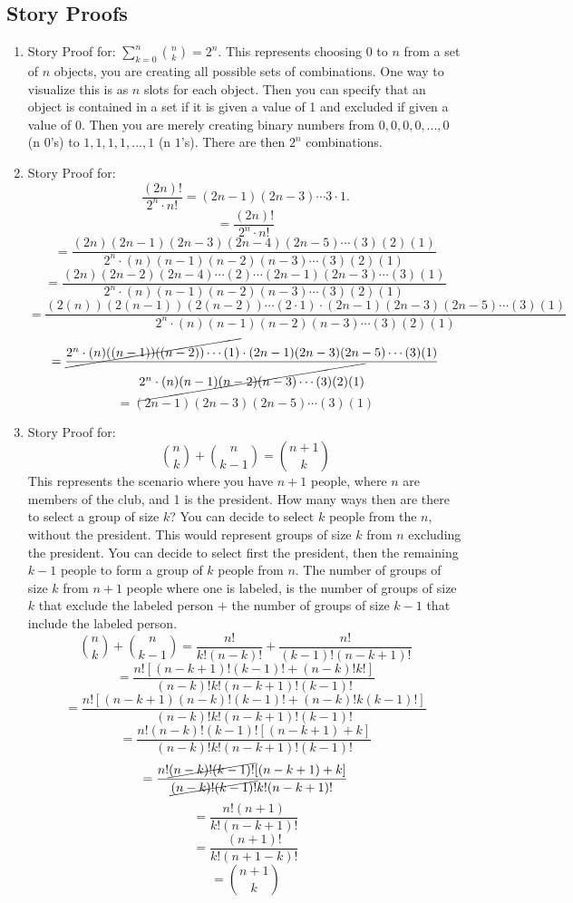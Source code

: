 \documentclass[11pt, oneside]{article}   	%
\begin{document}
\subsection{Story Proofs}
	\begin{enumerate}
		\item Story Proof for: $\sum_{k=0}^{n} \binom{n}{k} = 2^{n}$. This represents choosing 0 to $n$ from a set of $n$ objects, you are creating all possible sets of combinations. One way to visualize this is as $n$ slots for each object. Then you can specify that an object is contained in a set if it is given a value of 1 and excluded if given a value of 0. Then you are merely creating binary numbers from $0,0,0,0,...,0$ (n $0$'s) to $1,1,1,1,...,1$ (n $1$'s). There are then $2^{n}$ combinations.
		\item Story Proof for:
			\[
				\frac{(2n)!}{2^{n} \cdot n!} = (2n - 1)(2n - 3) \cdots 3 \cdot 1.
			\]
			\[
				= \frac{(2n)!}{2^{n} \cdot n!}
			\]
			\[
				= \frac{(2n)(2n-1)(2n-3)(2n-4)(2n-5) \cdots (3)(2)(1)}{2^{n} \cdot (n)(n-1)(n-2)(n-3) \cdots (3)(2)(1)}
			\]
			\[
				= \frac{(2n)(2n-2)(2n-4)  \cdots (2) \cdots (2n-1)(2n-3) \cdots (3)(1)}{2^{n} \cdot (n)(n-1)(n-2)(n-3) \cdots (3)(2)(1)}
			\]
			\[
				= \frac{(2(n))(2(n-1))(2(n-2)) \cdots (2 \cdot 1) \cdot (2n-1)(2n-3)(2n-5) \cdots (3)(1)}{2^{n} \cdot (n)(n-1)(n-2)(n-3) \cdots (3)(2)(1)}
			\]
			\vspace{4mm}
			\[
				= \frac{ \cancel{2^{n} \cdot (n)((n-1))((n-2)) \cdots (1)} \cdot (2n-1)(2n-3)(2n-5) \cdots (3)(1)}{\cancel{2^{n} \cdot (n)(n-1)(n-2)(n-3) \cdots (3)(2)(1)}}
			\]
			\vspace{4mm}
			\[
				= (2n-1)(2n-3)(2n-5) \cdots (3)(1)
			\]
		\item Story Proof for:
			\[
				\binom{n}{k} + \binom{n}{k-1} = \binom{n + 1}{k}
			\]
			This represents the scenario where you have $n + 1$ people, where $n$ are members of the club, and 1 is the president. How many ways then are there to select a group of size $k$? You can decide to select $k$ people from the $n$, without the president. This would represent groups of size $k$ from $n$ excluding the president. You can decide to select first the president, then the remaining $k-1$ people to form a group of $k$ people from $n$. The number of groups of size $k$ from $n+1$ people where one is labeled, is the number of groups of size $k$ that exclude the labeled person $+$ the number of groups of size $k-1$ that include the labeled person.
			\[
				\binom{n}{k} + \binom{n}{k-1} = \frac{n!}{k!(n-k)!} + \frac{n!}{(k-1)!(n-k+1)!}
			\]
			\[
				= \frac{n![(n-k+1)!(k-1)! + (n-k)!k!]}{(n-k)!k!(n-k+1)!(k-1)!}
			\]
			\[
				= \frac{n![(n-k+1)(n-k)!(k-1)! + (n-k)!k(k-1)!]}{(n-k)!k!(n-k+1)!(k-1)!}
			\]
			\[
				= \frac{n!(n-k)!(k-1)![(n-k+1) + k]}{(n-k)!k!(n-k+1)!(k-1)!}
			\]
			\[
				= \frac{n! \cancel{(n-k)!(k-1)!}[(n-k+1) + k]}{ \cancel{(n-k)!(k-1)!}k!(n-k+1)!}
			\]
			\[
				= \frac{n!(n+1)}{k!(n-k+1)!}
			\]
			\[
				= \frac{(n+1)!}{k!(n+1-k)!}
			\]
			\[
				= \binom{n+1}{k}
			\]
	\end{enumerate}
	
\end{document}
